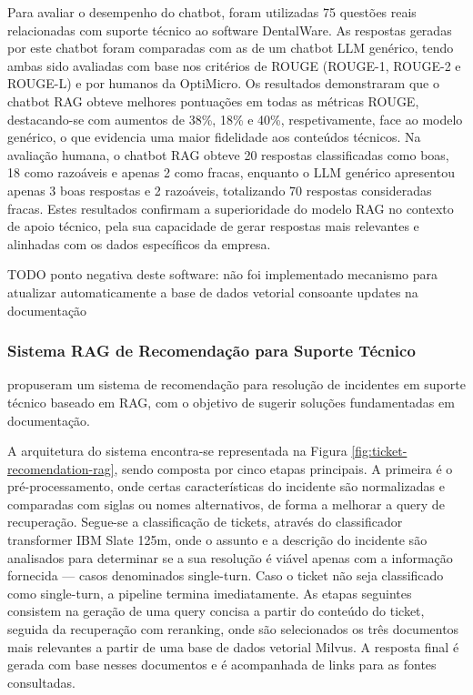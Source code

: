 Para avaliar o desempenho do chatbot, foram utilizadas 75 questões reais relacionadas com suporte técnico ao software DentalWare. As respostas geradas por este chatbot foram comparadas com as de um chatbot LLM genérico, tendo ambas sido avaliadas com base nos critérios de ROUGE (ROUGE-1, ROUGE-2 e ROUGE-L) e por humanos da OptiMicro. Os resultados demonstraram que o chatbot RAG obteve melhores pontuações em todas as métricas ROUGE, destacando-se com aumentos de 38\%, 18\% e 40\%, respetivamente, face ao modelo genérico, o que evidencia uma maior fidelidade aos conteúdos técnicos. Na avaliação humana, o chatbot RAG obteve 20 respostas classificadas como boas, 18 como razoáveis e apenas 2 como fracas, enquanto o LLM genérico apresentou apenas 3 boas respostas e 2 razoáveis, totalizando 70 respostas consideradas fracas. Estes resultados confirmam a superioridade do modelo RAG no contexto de apoio técnico, pela sua capacidade de gerar respostas mais relevantes e alinhadas com os dados específicos da empresa.



TODO ponto negativa deste software: não foi implementado mecanismo para atualizar automaticamente a base de dados vetorial consoante updates na documentação


\subsubsection{Sistema RAG de Recomendação para Suporte Técnico} 

\cite{isaza2024retrieval} propuseram um sistema de recomendação para resolução de incidentes em suporte técnico baseado em RAG, com o objetivo de sugerir soluções fundamentadas em documentação.


A arquitetura do sistema encontra-se representada na Figura \ref{fig:ticket-recomendation-rag}, sendo composta por cinco etapas principais. A primeira é o pré-processamento, onde certas características do incidente são normalizadas e comparadas com siglas ou nomes alternativos, de forma a melhorar a query de recuperação. Segue-se a classificação de tickets, através do classificador transformer IBM Slate 125m, onde o assunto e a descrição do incidente são analisados para determinar se a sua resolução é viável apenas com a informação fornecida — casos denominados single-turn. Caso o ticket não seja classificado como single-turn, a pipeline termina imediatamente.
As etapas seguintes consistem na geração de uma query concisa a partir do conteúdo do ticket, seguida da recuperação com reranking, onde são selecionados os três documentos mais relevantes a partir de uma base de dados vetorial Milvus. A resposta final é gerada com base nesses documentos e é acompanhada de links para as fontes consultadas.

